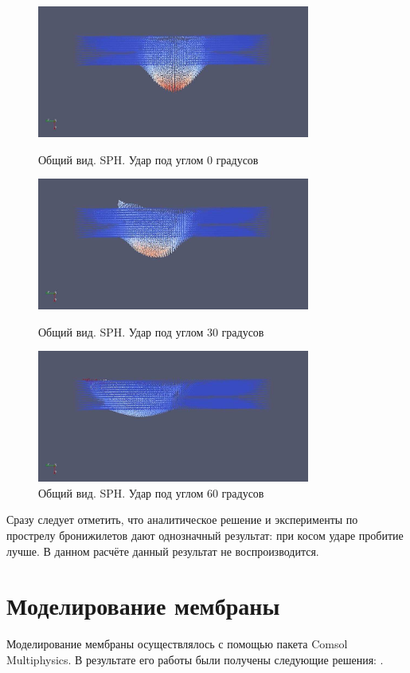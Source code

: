 \begin{figure}[H]
    \centering

    \includegraphics[width=0.8\textwidth]{img/sph_0.png}
    \caption{Общий вид. SPH. Удар под углом 0 градусов}

    \includegraphics[width=0.8\textwidth]{img/sph_30.png}
    \caption{Общий вид. SPH. Удар под углом 30 градусов}

    \includegraphics[width=0.8\textwidth]{img/sph_60.png}
    \caption{Общий вид. SPH. Удар под углом 60 градусов}
\end{figure}

Сразу следует отметить, что аналитическое решение и эксперименты по прострелу бронижилетов дают однозначный результат:
при косом ударе пробитие лучше.
В данном расчёте данный результат не воспроизводится.

\section{Моделирование мембраны}\label{sec:model-membrane}
Моделирование мембраны осуществлялось с помощью пакета Comsol Multiphysics.
В результате его работы были получены следующие решения: .

